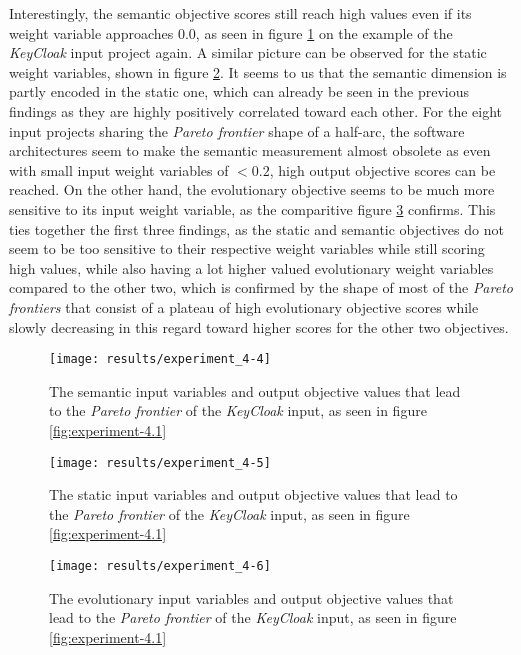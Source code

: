 \documentclass[12pt,a4paper]{report}
\begin{document}
Interestingly, the semantic objective scores still reach high values even if
its weight variable approaches $0.0$, as seen in figure \ref{fig:experiment-4.4}
on the example of the \textit{KeyCloak} input project again.
A similar picture can be observed for the static weight variables, shown in
figure \ref{fig:experiment-4.5}.
It seems to us that the semantic dimension is partly encoded in the static one,
which can already be seen in the previous findings as they are highly
positively correlated toward each other. For the eight input projects sharing
the \textit{Pareto frontier} shape of a half\hyp arc, the software architectures
seem to make the semantic measurement almost obsolete as even with small input
weight variables of $<0.2$, high output objective scores can be reached.
On the other hand, the evolutionary objective seems to be much more sensitive
to its input weight variable, as the comparitive figure \ref{fig:experiment-4.6}
confirms. This ties together the first three findings, as the static and
semantic objectives do not seem to be too sensitive to their respective weight
variables while still scoring high values, while also having a lot higher valued
evolutionary weight variables compared to the other two, which is confirmed by
the shape of most of the \textit{Pareto frontiers} that consist of a plateau
of high evolutionary objective scores while slowly decreasing in this regard
toward higher scores for the other two objectives.

\begin{figure}[htbp]
\centering
\texttt{[image: results/experiment\_4-4]}
\caption{The semantic input variables and output objective values that lead to the \textit{Pareto frontier} of the \textit{KeyCloak} input, as seen in figure \ref{fig:experiment-4.1}}
\label{fig:experiment-4.4}
\end{figure}

\begin{figure}[htbp]
\centering
\texttt{[image: results/experiment\_4-5]}
\caption{The static input variables and output objective values that lead to the \textit{Pareto frontier} of the \textit{KeyCloak} input, as seen in figure \ref{fig:experiment-4.1}}
\label{fig:experiment-4.5}
\end{figure}

\begin{figure}[htbp]
\centering
\texttt{[image: results/experiment\_4-6]}
\caption{The evolutionary input variables and output objective values that lead to the \textit{Pareto frontier} of the \textit{KeyCloak} input, as seen in figure \ref{fig:experiment-4.1}}
\label{fig:experiment-4.6}
\end{figure}
\end{document}
